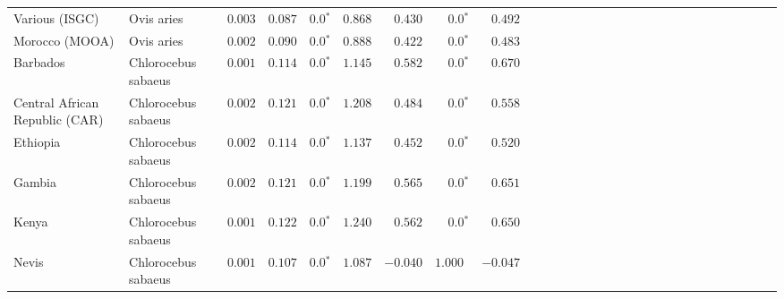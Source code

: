 \begin{center}
\begin{adjustbox}{width = 1\textwidth}
\begin{tabular}{|l|l|r|r|r|r|r|r|r|r|r|r|r|r|r|r|r|r|r|r|r|r|r|r|r|r|r|r|r|}
                 Various (ISGC) &           Ovis aries &           $ 0.003$ &                      $ 0.087$ &                  $\bm{0.0{^*}}$ &                                           $ 0.868$ &                      $ 0.430$ &                  $\bm{0.0{^*}}$ &                                           $ 0.492$ \\
                 Morocco (MOOA) &           Ovis aries &           $ 0.002$ &                      $ 0.090$ &                  $\bm{0.0{^*}}$ &                                           $ 0.888$ &                      $ 0.422$ &                  $\bm{0.0{^*}}$ &                                           $ 0.483$ \\
                       Barbados &  Chlorocebus sabaeus &           $ 0.001$ &                      $ 0.114$ &                  $\bm{0.0{^*}}$ &                                           $ 1.145$ &                      $ 0.582$ &                  $\bm{0.0{^*}}$ &                                           $ 0.670$ \\
 Central African Republic (CAR) &  Chlorocebus sabaeus &           $ 0.002$ &                      $ 0.121$ &                  $\bm{0.0{^*}}$ &                                           $ 1.208$ &                      $ 0.484$ &                  $\bm{0.0{^*}}$ &                                           $ 0.558$ \\
                       Ethiopia &  Chlorocebus sabaeus &           $ 0.002$ &                      $ 0.114$ &                  $\bm{0.0{^*}}$ &                                           $ 1.137$ &                      $ 0.452$ &                  $\bm{0.0{^*}}$ &                                           $ 0.520$ \\
                         Gambia &  Chlorocebus sabaeus &           $ 0.002$ &                      $ 0.121$ &                  $\bm{0.0{^*}}$ &                                           $ 1.199$ &                      $ 0.565$ &                  $\bm{0.0{^*}}$ &                                           $ 0.651$ \\
                          Kenya &  Chlorocebus sabaeus &           $ 0.001$ &                      $ 0.122$ &                  $\bm{0.0{^*}}$ &                                           $ 1.240$ &                      $ 0.562$ &                  $\bm{0.0{^*}}$ &                                           $ 0.650$ \\
                          Nevis &  Chlorocebus sabaeus &           $ 0.001$ &                      $ 0.107$ &                  $\bm{0.0{^*}}$ &                                           $ 1.087$ &                      $-0.040$ &                      $ 1.000~~$ &                                           $-0.047$ \\

\end{tabular}
\end{adjustbox}
\end{center}
